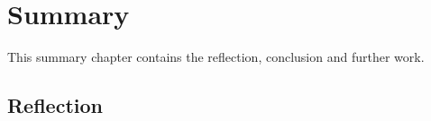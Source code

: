 \chapter{Summary}
This summary chapter contains the reflection, conclusion and further work.

\section{Reflection}

